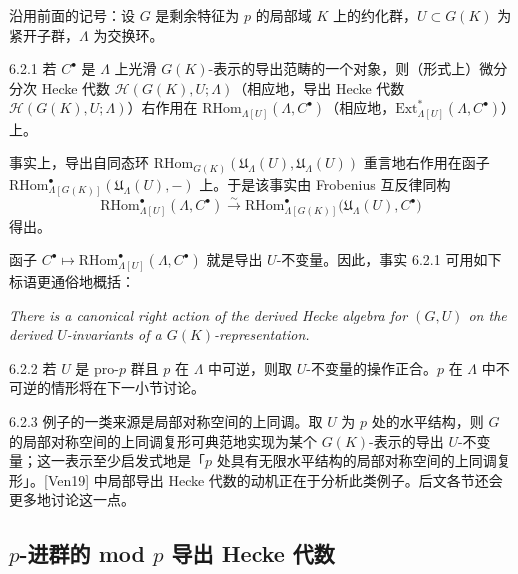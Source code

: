 沿用前面的记号：设 $G$ 是剩余特征为 $p$ 的局部域 $K$ 上的约化群，$U\subset G(K)$ 为紧开子群，$\Lambda$ 为交换环。

\begin{fact}{6.2.1}\label{thm:a6-04-8}
若 $C^\bullet$ 是 $\Lambda$ 上光滑 $G(K)$-表示的导出范畴的一个对象，则（形式上）微分分次 Hecke 代数 $\mathscr H(G(K),U;\Lambda)$（相应地，导出 Hecke 代数 $\mathcal H(G(K),U;\Lambda)$）右作用在 $\mathrm{RHom}_{\Lambda[U]}(\Lambda,C^\bullet)$（相应地，$\mathrm{Ext}^*_{\Lambda[U]}(\Lambda,C^\bullet)$）上。
\end{fact}

事实上，导出自同态环 $\mathrm{RHom}_{G(K)}(\mathfrak U_\Lambda(U),\mathfrak U_\Lambda(U))$ 重言地右作用在函子 $\mathrm{RHom}^\bullet_{\Lambda[G(K)]}(\mathfrak U_\Lambda(U),-)$ 上。于是该事实由 Frobenius 互反律同构
\begin{equation}\tag{6.2.1}\label{eq:a6-04-7}
\mathrm{RHom}^\bullet_{\Lambda[U]}(\Lambda,C^\bullet)\xrightarrow{\sim}\mathrm{RHom}^\bullet_{\Lambda[G(K)]}\bigl(\mathfrak U_\Lambda(U),C^\bullet\bigr)
\end{equation}
得出。

函子 $C^\bullet\mapsto\mathrm{RHom}^\bullet_{\Lambda[U]}(\Lambda,C^\bullet)$ 就是导出 $U$-不变量。因此，事实 6.2.1 可用如下标语更通俗地概括：
\begin{center}
\itshape There is a canonical right action of the derived Hecke algebra for $(G,U)$ on the derived $U$-invariants of a $G(K)$-representation.
\end{center}

\begin{rem}{6.2.2}\label{thm:a6-04-9}
若 $U$ 是 pro-$p$ 群且 $p$ 在 $\Lambda$ 中可逆，则取 $U$-不变量的操作正合。$p$ 在 $\Lambda$ 中不可逆的情形将在下一小节讨论。
\end{rem}

\begin{exam}{6.2.3}\label{thm:a6-04-10}
例子的一类来源是局部对称空间的上同调。取 $U$ 为 $p$ 处的水平结构，则 $G$ 的局部对称空间的上同调复形可典范地实现为某个 $G(K)$-表示的导出 $U$-不变量；这一表示至少启发式地是「$p$ 处具有无限水平结构的局部对称空间的上同调复形」。[Ven19] 中局部导出 Hecke 代数的动机正在于分析此类例子。后文各节还会更多地讨论这一点。
\end{exam}


\subsection{$p$-进群的 mod $p$ 导出 Hecke 代数}

